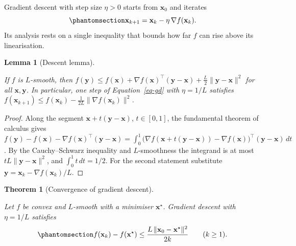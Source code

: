 \documentclass[
  english,
  11pt,
  a4paper,
  twoside,
  open=any,
  numbers=noenddot]{scrbook}
\theoremstyle{plain}
\newtheorem{theorem}{Theorem}[chapter]
\theoremstyle{plain}
\theoremstyle{plain}
\newtheorem{lemma}{Lemma}[chapter]
\theoremstyle{definition}
\theoremstyle{definition}
\theoremstyle{definition}
\theoremstyle{remark}
\begin{document}
Gradient descent with step size \(\eta>0\)
starts from \(\mathbf{x}_0\) and iterates
\begin{equation}\protect\phantomsection\label{eq-gd}{
\mathbf{x}_{k+1} = \mathbf{x}_k - \eta\,\nabla f(\mathbf{x}_k).
}\end{equation} Its analysis rests on a single inequality that bounds
how far \(f\) can rise above its linearisation.

\begin{lemma}[Descent
lemma]\protect\hypertarget{lem-descent}{}\label{lem-descent}

If \(f\) is \(L\)-smooth, then
\(f(\mathbf{y}) \le f(\mathbf{x}) + \nabla f(\mathbf{x})^\top(\mathbf{y}-\mathbf{x}) + \tfrac{L}{2}\lVert\mathbf{y}-\mathbf{x}\rVert^2\)
for all \(\mathbf{x},\mathbf{y}\). In particular, one step of
Equation~\ref{eq-gd} with \(\eta = 1/L\) satisfies
\(f(\mathbf{x}_{k+1}) \le f(\mathbf{x}_k) - \tfrac{1}{2L}\lVert\nabla f(\mathbf{x}_k)\rVert^2\).

\end{lemma}

\begin{proof}
Along the segment \(\mathbf{x}+t(\mathbf{y}-\mathbf{x})\),
\(t\in[0,1]\), the fundamental theorem of calculus gives
\(f(\mathbf{y}) - f(\mathbf{x}) - \nabla f(\mathbf{x})^\top(\mathbf{y}-\mathbf{x}) = \int_0^1 \big(\nabla f(\mathbf{x}+t(\mathbf{y}-\mathbf{x})) - \nabla f(\mathbf{x})\big)^\top(\mathbf{y}-\mathbf{x})\,dt\).
By the Cauchy--Schwarz inequality and \(L\)-smoothness the integrand is
at most \(tL\lVert\mathbf{y}-\mathbf{x}\rVert^2\), and
\(\int_0^1 t\,dt = 1/2\). For the second statement substitute
\(\mathbf{y} = \mathbf{x}_k - \nabla f(\mathbf{x}_k)/L\).
\end{proof}

\begin{theorem}[Convergence of gradient
descent]\protect\hypertarget{thm-gd-convex}{}\label{thm-gd-convex}

Let \(f\) be convex and \(L\)-smooth with a minimiser
\(\mathbf{x}^\star\). Gradient descent with \(\eta = 1/L\) satisfies
\begin{equation}\protect\phantomsection\label{eq-gd-rate}{
f(\mathbf{x}_k) - f(\mathbf{x}^\star) \le \frac{L\,\lVert\mathbf{x}_0 - \mathbf{x}^\star\rVert^2}{2k} \qquad (k\ge 1).
}\end{equation}

\end{theorem}
\end{document}
